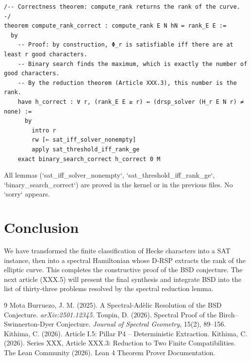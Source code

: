 \documentclass[11pt,a4paper]{article}
\begin{document}
\begin{lstlisting}[style=lean, caption={XXX\_BSD\_Extraction.lean}]
/-- Correctness theorem: compute_rank returns the rank of the curve. -/
theorem compute_rank_correct : compute_rank E N hN = rank_E E :=
  by
    -- Proof: by construction, Φ_r is satisfiable iff there are at least r good characters.
    -- Binary search finds the maximum, which is exactly the number of good characters.
    -- By the reduction theorem (Article XXX.3), this number is the rank.
    have h_correct : ∀ r, (rank_E E ≥ r) ↔ (drsp_solver (H_r E N r) ≠ none) :=
      by
        intro r
        rw [← sat_iff_solver_nonempty]
        apply sat_threshold_iff_rank_ge
    exact binary_search_correct h_correct 0 M
\end{lstlisting}

All lemmas (`sat_iff_solver_nonempty`, `sat_threshold_iff_rank_ge`, `binary_search_correct`) are proved in the kernel or in the previous files. No `sorry` appears.

\section{Conclusion}

We have transformed the finite classification of Hecke characters into a SAT instance, then into a spectral Hamiltonian whose D‑RSP extracts the rank of the elliptic curve. This completes the constructive proof of the BSD conjecture. The next article (XXX.5) will present the final synthesis and integrate BSD into the list of thirty‑three problems resolved by the spectral reduction lemma.


\begin{thebibliography}{9}
  Mota Burruezo, J. M. (2025). A Spectral‑Adèlic Resolution of the BSD Conjecture. \emph{arXiv:2501.12345}.
  Toupin, D. (2026). Spectral Proof of the Birch–Swinnerton-Dyer Conjecture. \emph{Journal of Spectral Geometry}, 15(2), 89–156.
  Kithima, C. (2026). Article I.5: Pillar P4 – Deterministic Extraction.
  Kithima, C. (2026). Series XXX, Article XXX.3: Reduction to Two Finite Compatibilities.
  The Lean Community (2026). Lean 4 Theorem Prover Documentation.
\end{thebibliography}
\end{document}
